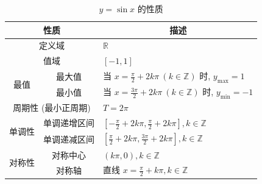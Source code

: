 \begin{table}[ht]
    \centering
    \caption{$y=\sin x$ 的性质}
    \renewcommand{\arraystretch}{1.5} %
    \begin{tabular}{c|c|l}
        \toprule[1.5pt]
        \multicolumn{2}{c|}{\textbf{性质}} & \multicolumn{1}{c}{\textbf{描述}}                                                                             \\
        \midrule
        \multicolumn{2}{c|}{定义域}         & $\mathbb{R}$                                                                                                \\
        \midrule
        \multicolumn{2}{c|}{值域}          & $[-1,1]$                                                                                                    \\
        \midrule
        \multirow{2}{*}{最值}              & 最大值                             & 当 $x=\frac{\pi}{2}+2k\pi \ (k\in \mathbb{Z})$ 时, $y_{\max}=1$             \\
        \cmidrule{2-3}
                                         & 最小值                             & 当 $x=\frac{3\pi}{2}+2k\pi \ (k\in \mathbb{Z})$ 时, $y_{\min}=-1$           \\
        \midrule
        \multicolumn{2}{c|}{周期性 (最小正周期)} & $T=2\pi$                                                                                                    \\
        \midrule
        \multirow{2}{*}{单调性}             & 单调递增区间                          & $\left[-\frac{\pi}{2}+2k\pi, \frac{\pi}{2}+2k\pi\right], k\in \mathbb{Z}$ \\
        \cmidrule{2-3}
                                         & 单调递减区间                          & $\left[\frac{\pi}{2}+2k\pi, \frac{3\pi}{2}+2k\pi\right], k\in \mathbb{Z}$ \\
        \midrule
        \multirow{2}{*}{对称性}             & 对称中心                            & $\left(k\pi, 0\right), k\in \mathbb{Z}$                                   \\
        \cmidrule{2-3}
                                         & 对称轴                             & 直线 $x=\frac{\pi}{2}+k\pi, k\in \mathbb{Z}$                                \\
        \bottomrule[1.5pt]
    \end{tabular}
\end{table}

\clearpage

